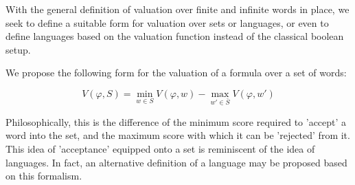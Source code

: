 

With the general definition of valuation over finite and infinite words in
place, we seek to define a suitable form for valuation over sets or languages,
or even to define languages based on the valuation function instead of the
classical boolean setup.


We propose the following form for the valuation of a formula over a set of words:

\begin{equation}
  V(\varphi, S) = \min_{w \in S} V(\varphi, w) - \max_{w' \in \bar{S}} V(\varphi, w')
\end{equation}

Philosophically, this is the difference of the minimum score required to
'accept' a word into the set, and the maximum score with which it can be
'rejected' from it. This idea of 'acceptance' equipped onto a set is reminiscent
of the idea of languages. In fact, an alternative definition of a language may
be proposed based on this formalism.

\begin{comment}

\begin{definition}[New Languages --- new name?]
  The \emph{language} $l(\varphi)$ of an LTL formulae $\varphi$ is the set S which
  maximizes $V(\varphi, S)$.
\end{definition}

Consider $V$ as the classical boolean valuation function used in LTL. In this
case, this new definition of a language coincides exactly with the classical
case. 

\begin{example}
  Consider 
  \begin{equation}
    V(\varphi, w) = \begin{cases}
      1  & \textnormal{iff } w \models \varphi \\
      0  & \textnormal{otherwise.}
    \end{cases}
  \end{equation}

    In this case, the set $S = \{w | w \models \varphi\}$ maximizes $V(\varphi,
    \cdot)$ with value 1. Suppose not, then there exists a set $S'$ such that
    $V(\varphi, S') > V(\varphi, S)$ and $S \not = S'$. Then,

  \begin{equation}
    V(\varphi, S') = \min_{w \in S'} V(\varphi, w) - \max_{w' \in \bar{S'}} V(\varphi, w')
  \end{equation}

  with $V(\varphi, w) \geq 0\; \forall\; w$. Since $S \not = S'$, there must
  exist $w \in \bar{S}$ such that $w \in S'$, or $w' \in S$ such that $w' \in
  \bar{S'}$. In either case, $V(\varphi, S') < 1$ trivially, and we have a
  contradiction.

\end{example}

\end{comment}